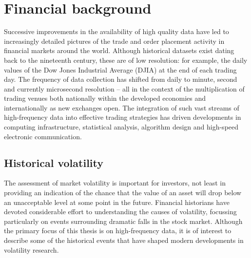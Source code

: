 \chapter{Financial background}\label{chap:HFFD}	%

Successive improvements in the availability of high quality data have led to increasingly detailed pictures of the trade and order placement activity in financial markets around the world. Although historical datasets exist dating back to the nineteenth century, these are of low resolution: for example, the daily values of the Dow Jones Industrial Average (DJIA) at the end of each trading day.   The frequency of data collection has shifted from daily to minute, second and currently microsecond resolution -- all in the context of the multiplication of trading venues both nationally within the developed economies and internationally as new exchanges open.  The integration of such vast streams of high-frequency data into effective trading strategies has driven developments in computing infrastructure, statistical analysis, algorithm design and high-speed electronic communication. 

\section{Historical volatility}
The assessment of market volatility is important for investors, not least in providing an indication of the chance that the value of an asset will drop below an unacceptable level at some point in the future. Financial historians have devoted considerable effort to understanding the causes of volatility, focussing particularly on events surrounding dramatic falls in the stock market. Although the primary focus of this thesis is on high-frequency data, it is of interest to describe some of the historical events that have shaped modern developments in volatility research.   

